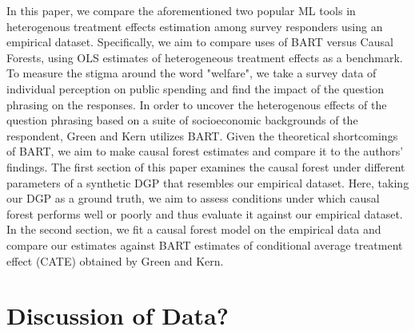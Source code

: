 \documentclass[12pt]{article}
\begin{document}
In this paper, we compare the aforementioned two popular ML tools in
heterogenous treatment effects estimation among survey responders using an
empirical dataset. Specifically, we aim to compare uses of BART versus Causal
Forests, using OLS estimates of heterogeneous treatment effects as a benchmark.
To measure the stigma around the word "welfare", we take a survey data of
individual perception on public spending and find the impact of the question
phrasing on the responses. In order to uncover the heterogenous effects of the
question phrasing based on a suite of socioeconomic backgrounds of the
respondent, Green and Kern utilizes BART. Given the theoretical shortcomings of
BART, we aim to make causal forest estimates and compare it to the authors'
findings. The first section of this paper examines the causal forest under
different parameters of a synthetic DGP that resembles our empirical dataset.
Here, taking our DGP as a ground truth, we aim to assess conditions under which
causal forest performs well or poorly and thus evaluate it against our empirical
dataset. In the second section, we fit a causal forest model on the empirical
data and compare our estimates against BART estimates of conditional average
treatment effect (CATE) obtained by Green and Kern. \\


\section{Discussion of Data?} 


\newpage


\end{document}
